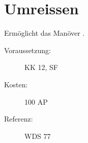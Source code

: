 \section{Umreissen}
\label{sf.umreissen}
Ermöglicht das Manöver .
\begin{description}
    \item[Voraussetzung:]
        KK 12, SF 
    \item [Kosten:]
        100 AP
    \item [Referenz:]
        WDS 77
\end{description}
